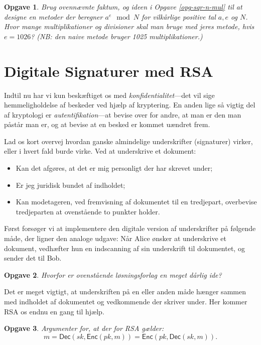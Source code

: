 \documentclass{article}
\theoremstyle{opgavedd}
\newtheorem{opgave}{Opgave}[section]
\newcommand\Enc{\ensuremath{\mathsf{Enc}}}
\newcommand\Dec{\ensuremath{\mathsf{Dec}}}
\begin{document}
\begin{opgave}
  Brug ovennævnte faktum, og ideen i Opgave \ref{opg-sqr-n-mul} til at designe en metoder
  der beregner $a^{e}\mod N$ for vilkårlige positive tal $a,e$ og $N$. Hvor mange
  multiplikationer og divisioner skal man bruge med jeres metode, hvis $e=1026$? (NB: den
  naive metode bruger 1025 multiplikationer.)
\end{opgave}

\section{Digitale Signaturer med RSA}
Indtil nu har vi kun beskæftiget os med \emph{konfidentialitet}---det vil sige
hemmeligholdelse af beskeder ved hjælp af kryptering. En anden lige så vigtig del af
kryptologi er \emph{autentifikation}---at bevise over for andre, at man er den man påstår
man er, og at bevise at en besked er kommet uændret frem.

Lad os kort overvej hvordan ganske almindelige underskrifter (signaturer) virker, eller i
hvert fald burde virke. Ved at underskrive et dokument:
\begin{itemize}

\item Kan det afgøres, at det er mig personligt der har skrevet under;

\item Er jeg juridisk bundet af indholdet;

\item Kan modetageren, ved fremvisning af dokumentet til en tredjepart, overbevise
  tredjeparten at ovenstående to punkter holder.

\end{itemize}

Først forsøger vi at implementere den digitale version af underskrifter på følgende måde,
der ligner den analoge udgave: Når Alice ønsker at underskrive et dokument, vedhæfter hun
en indscanning af sin underskrift til dokumentet, og sender det til Bob.

\begin{opgave}
  Hvorfor er ovenstående løsningsforlag en meget dårlig ide?
\end{opgave}

Det er meget vigtigt, at underskriften på en eller anden måde hænger sammen med indholdet
af dokumentet og vedkommende der skriver under. Her kommer RSA os endnu en gang til hjælp.

\begin{opgave}
  Argumenter for, at der for RSA gælder:
  \[
    m = \Dec(sk, \Enc(pk, m)) = \Enc(pk, \Dec(sk, m)).
  \]
\end{opgave}
\end{document}
